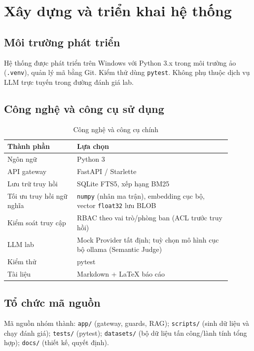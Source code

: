 \chapter{Xây dựng và triển khai hệ thống}
\label{ch:xay-dung}

\section{Môi trường phát triển}

Hệ thống được phát triển trên Windows với Python 3.x trong môi trường ảo (\texttt{.venv}), quản lý mã bằng Git. Kiểm thử dùng \texttt{pytest}. Không phụ thuộc dịch vụ LLM trực tuyến trong đường đánh giá lab.

\section{Công nghệ và công cụ sử dụng}

\begin{table}[H]
\centering
\caption{Công nghệ và công cụ chính}
\label{tab:tech}
\begin{tabular}{@{}p{0.28\linewidth}p{0.62\linewidth}@{}}
\toprule
\textbf{Thành phần} & \textbf{Lựa chọn} \\
\midrule
Ngôn ngữ & Python 3 \\
API gateway & FastAPI / Starlette \\
Lưu trữ truy hồi & SQLite FTS5, xếp hạng BM25 \\
Tối ưu truy hồi ngữ nghĩa & \texttt{numpy} (nhân ma trận), embedding cục bộ, vector \texttt{float32} lưu BLOB \\
Kiểm soát truy cập & RBAC theo vai trò/phòng ban (ACL trước truy hồi) \\
LLM lab & Mock Provider tất định; tuỳ chọn mô hình cục bộ ollama (Semantic Judge) \\
Kiểm thử & pytest \\
Tài liệu & Markdown + LaTeX báo cáo \\
\bottomrule
\end{tabular}
\end{table}

\section{Tổ chức mã nguồn}

Mã nguồn nhóm thành: \texttt{app/} (gateway, guards, RAG); \texttt{scripts/} (sinh dữ liệu và chạy đánh giá); \texttt{tests/} (pytest); \texttt{datasets/} (bộ dữ liệu tấn công/lành tính tổng hợp); \texttt{docs/} (thiết kế, quyết định).

